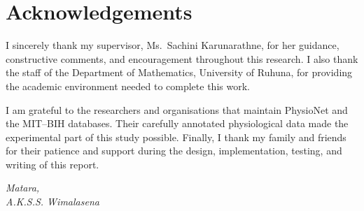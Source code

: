 \chapter*{Acknowledgements}\label{ack}
{}%
%
%
\prevspace
%
I sincerely thank my supervisor, Ms.\ Sachini Karunarathne, for her guidance,
constructive comments, and encouragement throughout this research.
I also thank the staff of the Department of Mathematics, University of Ruhuna,
for providing the academic environment needed to complete this work.

I am grateful to the researchers and organisations that maintain PhysioNet and
the MIT--BIH databases. Their carefully annotated physiological data made the
experimental part of this study possible. Finally, I thank my family and
friends for their patience and support during the design, implementation,
testing, and writing of this report.

\vfill
\begin{flushright}
\textit{
	Matara, \monthyeardate \\
	A.K.S.S. Wimalasena
}
\end{flushright}
